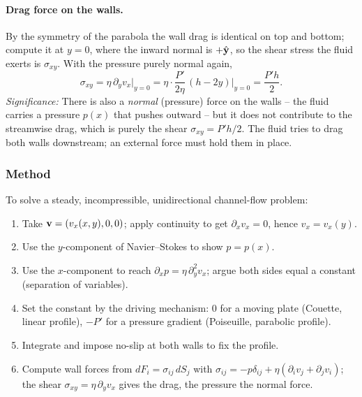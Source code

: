 \documentclass[../main.tex]{subfiles}
\begin{document}
\paragraph{Drag force on the walls.} By the symmetry of the parabola the wall drag is identical on top and bottom; compute it at $y=0$, where the inward normal is $+\hat{\mathbf{y}}$, so the shear stress the fluid exerts is $\sigma_{xy}$. With the pressure purely normal again,
\begin{equation}
  \sigma_{xy}=\eta\,\partial_y v_x\Big|_{y=0}
    = \eta\cdot\frac{P'}{2\eta}\,(h-2y)\Big|_{y=0}
    = \frac{P'h}{2}.
  \label{eq:lec19_poiseuille_drag}
\end{equation}
\textit{Significance:} There is also a \emph{normal} (pressure) force on the walls -- the fluid carries a pressure $p(x)$ that pushes outward -- but it does not contribute to the streamwise drag, which is purely the shear $\sigma_{xy}=P'h/2$. The fluid tries to drag both walls downstream; an external force must hold them in place.

\subsubsection*{Method}
To solve a steady, incompressible, unidirectional channel-flow problem:
\begin{enumerate}
  \item Take $\mathbf{v}=(v_x(x,y),0,0)$; apply continuity to get $\partial_x v_x=0$, hence $v_x=v_x(y)$.
  \item Use the $y$-component of Navier--Stokes to show $p=p(x)$.
  \item Use the $x$-component to reach $\partial_x p=\eta\,\partial_y^2 v_x$; argue both sides equal a constant (separation of variables).
  \item Set the constant by the driving mechanism: $0$ for a moving plate (Couette, linear profile), $-P'$ for a pressure gradient (Poiseuille, parabolic profile).
  \item Integrate and impose no-slip at both walls to fix the profile.
  \item Compute wall forces from $dF_i=\sigma_{ij}\,dS_j$ with $\sigma_{ij}=-p\delta_{ij}+\eta(\partial_iv_j+\partial_jv_i)$; the shear $\sigma_{xy}=\eta\,\partial_y v_x$ gives the drag, the pressure the normal force.
\end{enumerate}
\end{document}
